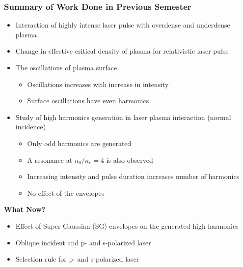 \documentclass{beamer}
\begin{document}
\begin{frame}
    \frametitle{Summary of Work Done in Previous Semester}
    \small
    \begin{itemize}
        \item Interaction of highly intense laser pulse with overdense and underdense plasma
        \item Change in effective critical density of plasma for relativistic laser pulse
        \item The oscillations of plasma surface.
              \begin{itemize}
                  \item Oscillations increases with increase in intensity
                  \item Surface oscillations have even harmonics
              \end{itemize}
        \item Study of high harmonics generation in laser plasma interaction (normal incidence)
              \begin{itemize}
                  \item Only odd harmonics are generated
                  \item A resonance at $n_0/n_c=4$ is also observed
                  \item Increasing intensity and pulse duration increases number of harmonics
                  \item No effect of the envelopes
              \end{itemize}
    \end{itemize}

    \textbf{What Now?}
    \begin{itemize}
        \item Effect of Super Gaussian (SG) envelopes on the generated high harmonics
        \item Oblique incident and p- and s-polarized laser
        \item Selection rule for p- and s-polarized laser
    \end{itemize}
\end{frame}
\end{document}
